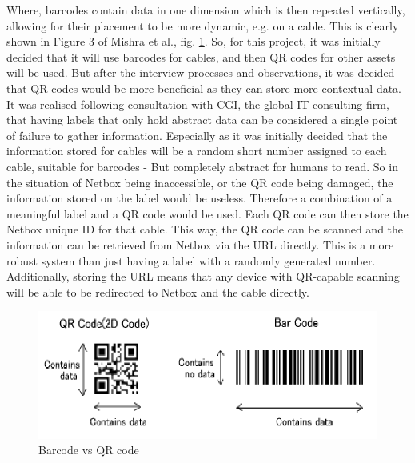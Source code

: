 \documentclass [11pt,a4paper]{article}
\begin{document}
Where, barcodes contain data in one dimension which is then repeated vertically, allowing for their placement to be more dynamic, e.g. on a cable. This is clearly shown in Figure 3 of Mishra et al., fig. \ref{fig:barcode}. So, for this project, it was initially decided that it will use barcodes for cables, and then QR codes for other assets will be used. But after the interview processes and observations, it was decided that QR codes would be more beneficial as they can store more contextual data. It was realised following consultation with CGI, the global IT consulting firm, that having labels that only hold abstract data can be considered a single point of failure to gather information. Especially as it was initially decided that the information stored for cables will be a random short number assigned to each cable, suitable for barcodes - But completely abstract for humans to read. So in the situation of Netbox being inaccessible, or the QR code being damaged, the information stored on the label would be useless. Therefore a combination of a meaningful label and a QR code would be used. Each QR code can then store the Netbox unique ID for that cable. This way, the QR code can be scanned and the information can be retrieved from Netbox via the URL directly. This is a more robust system than just having a label with a randomly generated number. Additionally, storing the URL means that any device with QR-capable scanning will be able to be redirected to Netbox and the cable directly.

\begin{figure}[H]
\centering
\includegraphics[width=.50\textwidth]{images/barcode_mishra.png}
\caption{Barcode vs QR code}
\label{fig:barcode}
\end{figure}
\end{document}
